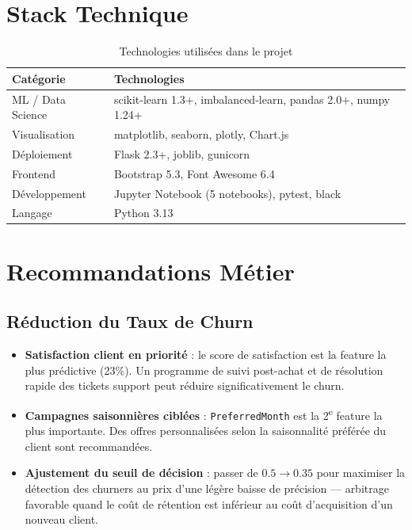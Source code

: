 \documentclass[12pt,a4paper]{article}
\begin{document}
\section{Stack Technique}

\begin{table}[H]
\centering
\caption{Technologies utilisées dans le projet}
\begin{tabular}{ll}
\toprule
\textbf{Catégorie} & \textbf{Technologies} \\
\midrule
ML / Data Science & scikit-learn 1.3+, imbalanced-learn, pandas 2.0+, numpy 1.24+ \\
Visualisation & matplotlib, seaborn, plotly, Chart.js \\
Déploiement & Flask 2.3+, joblib, gunicorn \\
Frontend & Bootstrap 5.3, Font Awesome 6.4 \\
Développement & Jupyter Notebook (5 notebooks), pytest, black \\
Langage & Python 3.13 \\
\bottomrule
\end{tabular}
\end{table}

\section{Recommandations Métier}

\subsection{Réduction du Taux de Churn}

\begin{itemize}
  \item \textbf{Satisfaction client en priorité} : le score de satisfaction est la feature
        la plus prédictive (23\%). Un programme de suivi post-achat et de résolution rapide
        des tickets support peut réduire significativement le churn.
  \item \textbf{Campagnes saisonnières ciblées} : \texttt{PreferredMonth} est la 2\textsuperscript{e}
        feature la plus importante. Des offres personnalisées selon la saisonnalité préférée
        du client sont recommandées.
  \item \textbf{Ajustement du seuil de décision} : passer de $0.5 \to 0.35$ pour maximiser
        la détection des churners au prix d'une légère baisse de précision — arbitrage favorable
        quand le coût de rétention est inférieur au coût d'acquisition d'un nouveau client.
\end{itemize}
\end{document}
